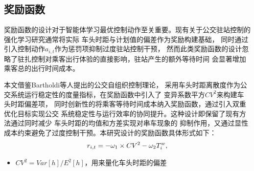 \subsection{奖励函数}
奖励函数的设计对于智能体学习最优控制动作至关重要。现有关于公交驻站控制的强化学习研究通常将实际
车头时距与计划值的偏差作为奖励构建基础，
同时通过引入控制动作$a_{i,t}$作为惩罚项抑制过度驻站控制干预\cite{alesiani2018reinforcement,wang2020dynamic,wang2021reducing}，
然而此类奖励函数的设计忽略了驻扎控制对乘客出行体验的直接影响，驻站产生的额外等待时间
会显著增加乘客总的出行时间成本。

本文借鉴Bartholdi等人\cite{bartholdi2012self}提出的公交自组织控制理论，
采用车头时距离散度作为公交系统运行稳定性的度量指标，在奖励函数中引入了
变异系数平方$CV^2$\cite{national2013transit}来构建车头时距偏差项，
同时创新性的将乘客等待时间成本纳入奖励函数，通过引入双重优化目标实现公交
系统稳定性与运行效率的协同提升。这种设计即保留了现有方法通过同时减少
车头时距的均值和方差实现对串车现象的
抑制作用，又通过显性成本约束避免了过度控制干预。本研究设计的奖励函数具体形式如下：
\begin{equation}\label{奖励函数}
    \\r_{i,t} = -\omega_1\times CV^2 -\omega_2 T^w_{i},
\end{equation}

\begin{itemize}
    \item $ CV^2 = Var[h]/E^2[h]$，用来量化车头时距的偏差
\end{itemize}

